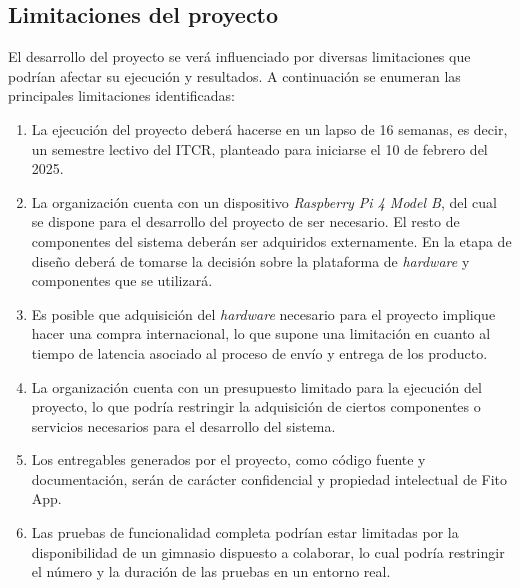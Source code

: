 \subsection{Limitaciones del proyecto}
El desarrollo del proyecto se verá influenciado por diversas limitaciones que podrían afectar su ejecución y resultados. A continuación se enumeran las principales limitaciones identificadas:

\begin{enumerate}
    \item La ejecución del proyecto deberá hacerse en un lapso de 16 semanas, es decir, un semestre lectivo del ITCR, planteado para iniciarse el 10 de febrero del 2025.
    \item La organización cuenta con un dispositivo \textit{Raspberry Pi 4 Model B}, del cual se dispone para el desarrollo del proyecto de ser necesario. El resto de componentes del sistema deberán ser adquiridos externamente. En la etapa de diseño deberá de tomarse la decisión sobre la plataforma de \textit{hardware} y componentes que se utilizará.
    \item Es posible que adquisición del \textit{hardware} necesario para el proyecto implique hacer una compra internacional, lo que supone una limitación en cuanto al tiempo de latencia asociado al proceso de envío y entrega de los producto.
    \item La organización cuenta con un presupuesto limitado para la ejecución del proyecto, lo que podría restringir la adquisición de ciertos componentes o servicios necesarios para el desarrollo del sistema.
    \item Los entregables generados por el proyecto, como código fuente y documentación, serán de carácter confidencial y propiedad intelectual de Fito App.
    \item Las pruebas de funcionalidad completa podrían estar limitadas por la disponibilidad de un gimnasio dispuesto a colaborar, lo cual podría restringir el número y la duración de las pruebas en un entorno real.
\end{enumerate}



